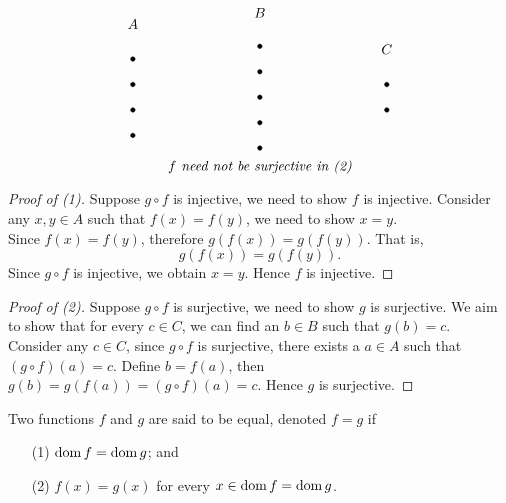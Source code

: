 \begin{proposition}
\begin{itemize}
\[\begin{tikzpicture}[scale=0.8]
\filldraw (0,1.2) circle (2pt);
\filldraw (0,0.4) circle (2pt);
\filldraw (0,-0.4) circle (2pt);
\filldraw (0,-1.2) circle (2pt);

\filldraw (4,1.6) circle (2pt);
\filldraw (4,0.8) circle (2pt);
\filldraw (4,0) circle (2pt);
\filldraw (4,-0.8) circle (2pt);
\filldraw (4,-1.6) circle (2pt);

\filldraw (8,0.4) circle (2pt);
\filldraw (8,-0.4) circle (2pt);

\node[above] at (8,1.2) {$C$};
\node[above] at (4,2.35) {$B$};
\node[above] at (0,2) {$A$};
\end{tikzpicture}\]
\[\text{\emph{$f$ need not be surjective in (2)}}\]
\end{itemize}
\end{proposition}

\begin{proof}[Proof of (1)]
Suppose $g\circ f$ is injective, we need to show $f$ is injective. Consider any $x, y \in A$ such that $f(x) = f(y)$, we need to show $x = y$.\\[0.5em] 
Since $f(x) = f(y)$, therefore $g(f(x)) = g(f(y))$. That is,
\[g(f(x)) = g(f(y)).\]
Since $g\circ f$ is injective, we obtain $x = y$.  Hence $f$ is injective.
\end{proof}
\begin{proof}[Proof of (2)]
Suppose $g\circ f$ is surjective, we need to show $g$ is surjective. We aim to show that for every $c \in C$, we can find an $b \in B$ such that $g(b) = c$.\\[0.5em]
Consider any $c \in C$, since $g\circ f$ is surjective, there exists a $a \in A$ such that $(g\circ f)(a) = c$. Define $b = f(a)$, then $g(b) = g(f(a)) = (g\circ f)(a) = c$. Hence $g$ is surjective. 
\end{proof}

\vspace*{1em}

\begin{definition}
Two functions $f$ and $g$ are said to be equal, denoted $f = g$ if
\begin{itemize}
\item[(1)] $\operatorname{dom} f = \operatorname{dom} g$; and
\item[(2)] $f(x) = g(x)$ for every $x \in \operatorname{dom} f = \operatorname{dom} g$.
\end{itemize}
\end{definition}

\vspace*{1em}

